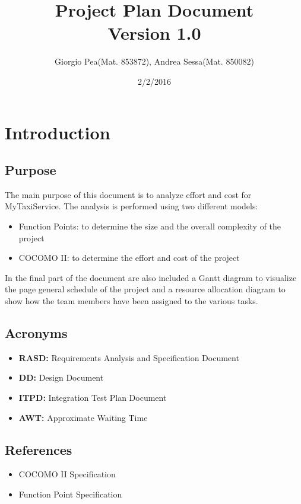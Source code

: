 \documentclass[11pt,titlepage]{article} %
\title{Project Plan Document \\ \vspace{1cm} \large{Version 1.0}}
\author{Giorgio Pea(Mat. 853872), Andrea Sessa(Mat. 850082)}
\date{2/2/2016}
\begin{document}
\maketitle

\newpage

\tableofcontents

\newpage

\section{Introduction}
  \subsection{Purpose}
    The main purpose of this document is to analyze effort and cost for MyTaxiService.
    The analysis is performed using two different models:
    \begin{itemize}
     \item Function Points: to determine the size and the overall complexity of the project
     \item COCOMO II: to determine the effort and cost of the project
    \end{itemize}
    In the final part of the document are also included a Gantt diagram to visualize the page
    general schedule of the project and a resource allocation diagram to show how the team 
    members have been assigned to the various tasks.

  \subsection{Acronyms}
    \begin{itemize}
     \item \textbf{RASD:} Requirements Analysis and Specification Document
     \item \textbf{DD:} Design Document
     \item \textbf{ITPD:} Integration Test Plan Document
     \item \textbf{AWT:} Approximate Waiting Time
    \end{itemize}
  \subsection{References}
    \begin{itemize}
     \item COCOMO II Specification
     \item Function Point Specification
    \end{itemize}
\end{document}
